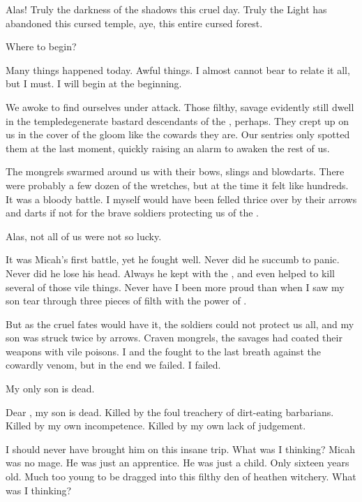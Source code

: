 \begin{diary}%
\diarystamp{\dateEreshKalDayTwo}

\new
Alas! 
Truly the darkness of the \qliphoth{} shadows this cruel day. 
Truly the Light has abandoned this cursed temple, aye, this entire cursed forest. 

Where to begin? 

Many things happened today. 
Awful things. 
I almost cannot bear to relate it all, but I must. 
I will begin at the beginning. 

We awoke to find ourselves under attack. 
Those filthy, savage \meccara{} evidently still dwell in the temple\dash degenerate bastard descendants of the \EreshKali, perhaps. 
They crept up on us in the cover of the gloom like the cowards they are. 
Our sentries only spotted them at the last moment, quickly raising an alarm to awaken the rest of us. 

The mongrels swarmed around us with their bows, slings and blowdarts. 
There were probably a few dozen of the wretches, but at the time it felt like hundreds. 
It was a bloody battle. 
I myself would have been felled thrice over by their arrows and darts if not for the brave soldiers protecting us of the \ishrah. 

Alas, not all of us were not so lucky. 

It was Micah's first battle, yet he fought well. 
Never did he succumb to panic. 
Never did he lose his head. 
Always he kept with the \ishrah, and even helped to kill several of those vile things. 
Never have I been more proud than when I saw my son tear through three pieces of \meccaran{} filth with the power of \Izion. 

But as the cruel fates would have it, the soldiers could not protect us all, and my son was struck twice by arrows. 
Craven mongrels, the savages had coated their weapons with vile poisons. 
I and the \ishrah{} fought to the last breath against the cowardly venom, but in the end we failed. 
I failed. 

My only son is dead. 

Dear \iquin, my son is dead. 
Killed by the foul treachery of dirt-eating barbarians. 
Killed by my own incompetence. 
Killed by my own lack of judgement. 

I should never have brought him on this insane trip. 
What was I thinking? 
Micah was no \ishrah{} mage. 
He was just an apprentice. 
He was just a child. 
Only sixteen years old. 
Much too young to be dragged into this filthy den of heathen witchery. 
What was I thinking? 


\end{diary}
